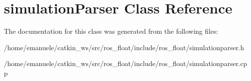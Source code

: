 \hypertarget{classsimulationParser}{}\section{simulation\+Parser Class Reference}
\label{classsimulationParser}


The documentation for this class was generated from the following files\+:\begin{DoxyCompactItemize}
\item 
/home/emanuele/catkin\+\_\+ws/src/ros\+\_\+float/include/ros\+\_\+float/simulationparser.\+h\item 
/home/emanuele/catkin\+\_\+ws/src/ros\+\_\+float/include/ros\+\_\+float/simulationparser.\+cpp\end{DoxyCompactItemize}
